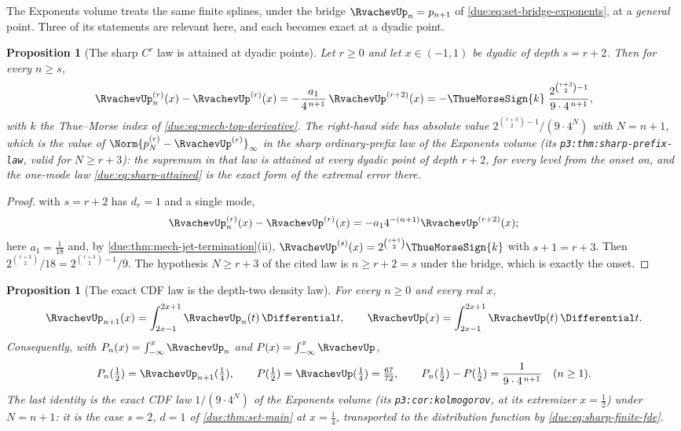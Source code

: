 \documentclass[11pt,oneside]{article}
\theoremstyle{plain}
\newtheorem{proposition}[theorem]{Proposition}
\theoremstyle{definition}
\theoremstyle{remark}
\newcommand{\upn}[1]{\RvachevUp_{#1}}
\newcommand{\am}[1]{a_{#1}}                                 %
\begin{document}
The Exponents volume \cite{proveit-exponents} treats the same finite
splines, under the bridge $\upn{n}=p_{n+1}$ of
\cref{due:eq:set-bridge-exponents}, at a \emph{general} point.  Three of its
statements are relevant here, and each becomes exact at a dyadic point.

\begin{proposition}[The sharp $C^{r}$ law is attained at dyadic points]
\label{due:prop:sharp-attained}
Let $r\ge0$ and let $x\in(-1,1)$ be dyadic of depth $s=r+2$.  Then for every
$n\ge s$,
\begin{equation}
 \upn{n}^{(r)}(x)-\RvachevUp^{(r)}(x)
 =-\frac{\am{1}}{4^{\,n+1}}\,\RvachevUp^{(r+2)}(x)
 =-\ThueMorseSign{k}\;\frac{2^{\binom{r+3}{2}-1}}{9\cdot4^{\,n+1}},
 \label{due:eq:sharp-attained}
\end{equation}
with $k$ the Thue--Morse index of \cref{due:eq:mech-top-derivative}.  The
right-hand side has absolute value $2^{\binom{r+3}{2}-1}/(9\cdot4^{N})$ with
$N=n+1$, which is the value of $\Norm{p_{N}^{(r)}-\RvachevUp^{(r)}}_{\infty}$
in the sharp ordinary-prefix law of the Exponents volume (its
\texttt{p3:thm:sharp-prefix-law}, valid for $N\ge r+3$): the supremum in
that law is attained at every dyadic point of depth $r+2$, for every level
from the onset on, and the one-mode law \cref{due:eq:sharp-attained} is the
exact form of the extremal error there.
\end{proposition}

\begin{proof}
 with $s=r+2$ has $d_{r}=1$ and a single
mode,
\[
 \upn{n}^{(r)}(x)-\RvachevUp^{(r)}(x)=-\am{1}4^{-(n+1)}\RvachevUp^{(r+2)}(x);
\]
here $\am{1}=\tfrac1{18}$ and, by \cref{due:thm:mech-jet-termination}(ii),
$\RvachevUp^{(s)}(x)=2^{\binom{s+1}{2}}\ThueMorseSign{k}$ with
$s+1=r+3$.  Then $2^{\binom{r+3}{2}}/18=2^{\binom{r+3}{2}-1}/9$.  The
hypothesis $N\ge r+3$ of the cited law is $n\ge r+2=s$ under the bridge,
which is exactly the onset.
\end{proof}

\begin{proposition}[The exact CDF law is the depth-two density law]
\label{due:prop:sharp-cdf}
For every $n\ge0$ and every real $x$,
\begin{equation}
 \upn{n+1}(x)=\int_{2x-1}^{2x+1}\upn{n}(t)\,\Differential t,
 \qquad
 \RvachevUp(x)=\int_{2x-1}^{2x+1}\RvachevUp(t)\,\Differential t .
 \label{due:eq:sharp-finite-fde}
\end{equation}
Consequently, with $P_{n}(x)=\int_{-\infty}^{x}\upn{n}$ and
$P(x)=\int_{-\infty}^{x}\RvachevUp$,
\begin{equation}
 P_{n}(\tfrac12)=\upn{n+1}(\tfrac14),\qquad
 P(\tfrac12)=\RvachevUp(\tfrac14)=\tfrac{67}{72},\qquad
 P_{n}(\tfrac12)-P(\tfrac12)=\frac{1}{9\cdot4^{\,n+1}}
 \quad(n\ge1).
 \label{due:eq:sharp-cdf-half}
\end{equation}
The last identity is the exact CDF law $1/(9\cdot4^{N})$ of the Exponents
volume (its \texttt{p3:cor:kolmogorov}, at its extremizer $x=\tfrac12$)
under $N=n+1$: it is the case $s=2$, $d=1$ of \cref{due:thm:set-main} at
$x=\tfrac14$, transported to the distribution function by
\cref{due:eq:sharp-finite-fde}.
\end{proposition}
\end{document}
